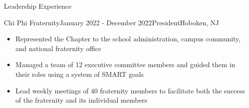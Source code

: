 \documentclass{resume} %
\begin{document}
\vspace{-1mm}
\begin{rSection}{Leadership Experience}
\begin{rSubsection}
{Chi Phi Fraternity}{January 2022 - December 2022}{President}{Hoboken, NJ}
\item[]\renewcommand\labelitemi{$\vcenter{\hbox{\tiny$\bullet$}}$} \begin{itemize}
    \item Represented the Chapter to the school administration, campus community, and national fraternity office
    \vspace{-1mm}
    \item Managed a team of 12 executive committee members and guided them in their roles using a system of SMART goals
    \vspace{-4.5mm}
    \item Lead weekly meetings of 40 fraternity members to facilitate both the success of the fraternity and its individual members
\end{itemize}
\end{rSubsection}
\vspace{-1mm}
\end{rSection}
\vspace{-1mm}
\end{document}
